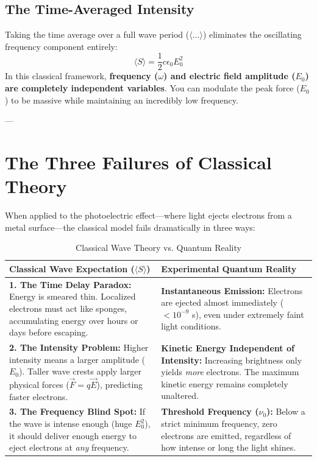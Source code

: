 \documentclass[11pt,a4paper]{article}
\begin{document}
	\subsection{The Time-Averaged Intensity}
	Taking the time average over a full wave period ($\langle \dots \rangle$) eliminates the oscillating frequency component entirely:
	\begin{equation}
		\langle S \rangle = \frac{1}{2} c \epsilon_0 E_0^2
	\end{equation}
	In this classical framework, \textbf{frequency ($\omega$) and electric field amplitude ($E_0$) are completely independent variables}. You can modulate the peak force ($E_0$) to be massive while maintaining an incredibly low frequency.
	
	---
	
	\section{The Three Failures of Classical Theory}
	When applied to the photoelectric effect—where light ejects electrons from a metal surface—the classical model fails dramatically in three ways:
	
	\begin{table}[h!]
		\centering
		\caption{Classical Wave Theory vs. Quantum Reality}
		\begin{tabular}{p{7cm}p{8cm}}
			\toprule
			\textbf{Classical Wave Expectation ($\langle S \rangle$)} & \textbf{Experimental Quantum Reality} \\
			\midrule
			\textbf{1. The Time Delay Paradox:} Energy is smeared thin. Localized electrons must act like sponges, accumulating energy over hours or days before escaping. & \textbf{Instantaneous Emission:} Electrons are ejected almost immediately ($< 10^{-9}$ s), even under extremely faint light conditions. \\
			\addlinespace
			\textbf{2. The Intensity Problem:} Higher intensity means a larger amplitude ($E_0$). Taller wave crests apply larger physical forces ($\vec{F}=q\vec{E}$), predicting faster electrons. & \textbf{Kinetic Energy Independent of Intensity:} Increasing brightness only yields \textit{more} electrons. The maximum kinetic energy remains completely unaltered. \\
			\addlinespace
			\textbf{3. The Frequency Blind Spot:} If the wave is intense enough (huge $E_0^2$), it should deliver enough energy to eject electrons at \textit{any} frequency. & \textbf{Threshold Frequency ($\nu_0$):} Below a strict minimum frequency, zero electrons are emitted, regardless of how intense or long the light shines. \\
			\bottomrule
		\end{tabular}
	\end{table}
	
\end{document}
